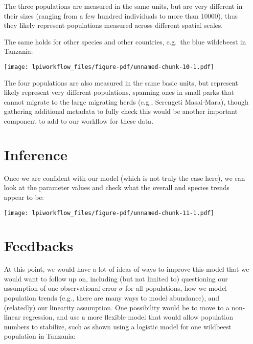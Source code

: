 \documentclass[
  letterpaper,
  DIV=11,
  numbers=noendperiod]{scrartcl}
\begin{document}
The three populations are measured in the same units, but are very
different in their sizes (ranging from a few hundred individuals to more
than 10000), thus they likely represent populations measured across
different spatial scales.

The same holds for other species and other countries, e.g.~the blue
wildebeest in Tanzania:

\texttt{[image: lpiworkflow\_files/figure-pdf/unnamed-chunk-10-1.pdf]}

The four populations are also measured in the same basic units, but
represent likely represent very different populations, spanning ones in
small parks that cannot migrate to the large migrating herds (e.g.,
Serengeti Masai-Mara), though gathering additional metadata to fully
check this would be another important component to add to our workflow
for these data.

\section{Inference}\label{inference}

Once we are confident with our model (which is not truly the case here),
we can look at the parameter values and check what the overall and
species trends appear to be:

\texttt{[image: lpiworkflow\_files/figure-pdf/unnamed-chunk-11-1.pdf]}

\section{Feedbacks}\label{feedbacks}

At this point, we would have a lot of ideas of ways to improve this
model that we would want to follow up on, including (but not limited to)
questioning our assumption of one observational error \(\sigma\) for all
populations, how we model population trends (e.g., there are many ways
to model abundance), and (relatedly) our linearity assumption. One
possibility would be to move to a non-linear regression, and use a more
flexible model that would allow population numbers to stabilize, such as
shown using a logistic model for one wildbeest population in Tanzania:
\end{document}
